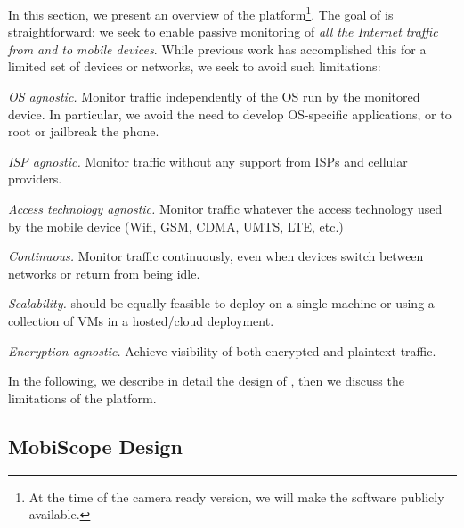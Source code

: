 In this section, we present an overview of the \platname{} platform\footnote{At the
  time of the camera ready version, we will make the \platname{}
  software publicly available.}. The goal of \platname{} is straightforward: we 
 seek to enable passive monitoring of \emph{all
  the Internet traffic from and to mobile devices}. While previous work has accomplished 
  this for a limited set of devices or networks, we seek to avoid such limitations: 
\begin{packedenumerate}
\item \emph{OS agnostic.} Monitor traffic independently of
  the OS run by the monitored device. In particular, we avoid the need to 
  develop OS-specific applications, or to root or jailbreak the phone.
\item \emph{ISP agnostic.} Monitor traffic without any
  support from ISPs and cellular providers.
\item \emph{Access technology agnostic.} Monitor traffic
  whatever the access technology used by the mobile device (Wifi, GSM,
  CDMA, UMTS, LTE, etc.)
\item \emph{Continuous.} Monitor traffic continuously, even when devices switch 
between networks or return from being idle.

\item \emph{Scalability.} \platname{} should be equally feasible to deploy 
on a single machine or using a collection of VMs in a hosted/cloud deployment. 

\item \emph{Encryption agnostic.} Achieve visibility of both encrypted and plaintext traffic.

 \end{packedenumerate}    
 

In the following, we describe in detail the design of \platname{},
then we discuss the limitations of the platform.


\subsection{MobiScope Design}


